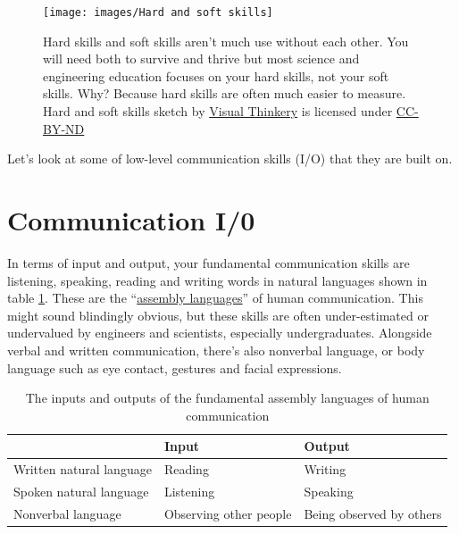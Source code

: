 \documentclass[
]{book}
\begin{document}
\begin{figure}

{\centering \texttt{[image: images/Hard and soft skills]} 

}

\caption{Hard skills and soft skills aren't much use without each other. You will need both to survive and thrive but most science and engineering education focuses on your hard skills, not your soft skills. Why? Because hard skills are often much easier to measure. Hard and soft skills sketch by \href{https://visualthinkery.com/}{Visual Thinkery} is licensed under \href{https://creativecommons.org/licenses/by-nd/4.0/}{CC-BY-ND}}\label{fig:allskills-fig}
\end{figure}



Let's look at some of low-level communication skills (I/O) that they are built on.

\hypertarget{cio}{%
\section{Communication I/0}\label{cio}}

In terms of input and output, your fundamental communication skills are listening, speaking, reading and writing words in natural languages shown in table \ref{tab:iotable}. These are the ``\href{https://en.wikipedia.org/wiki/Assembly_language}{assembly languages}'' of human communication. This might sound blindingly obvious, but these skills are often under-estimated or undervalued by engineers and scientists, especially undergraduates. Alongside verbal and written communication, there's also nonverbal language, or body language such as eye contact, gestures and facial expressions.

\begin{table}

\caption{\label{tab:iotable}The inputs and outputs of the fundamental assembly languages of human communication }
\centering
\begin{tabular}[t]{lll}
\toprule
 & Input & Output\\
\midrule
Written natural language & Reading & Writing\\
Spoken natural language & Listening & Speaking\\
Nonverbal language & Observing other people & Being observed by others\\
\bottomrule
\end{tabular}
\end{table}
\end{document}
